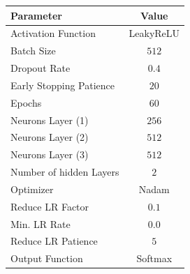 \documentclass[
  12pt,
  bibliography=totoc,     %
  captions=tableheading,  %
  titlepage=firstiscover, %
]{scrartcl}
\begin{document}
\begin{figure}[H]
    \centering
    \begin{minipage}{0.49\textwidth}
        \centering
        \small
        \begin{tabular}{l c}
            \toprule
            Parameter & Value \\
            \midrule
            Activation Function     & LeakyReLU \\
            Batch Size              & $512$     \\
            Dropout Rate            & $0.4$     \\
            Early Stopping Patience & $20$      \\
            Epochs                  & $60$      \\
            Neurons Layer (1)       & $256$     \\
            Neurons Layer (2)       & $512$     \\
            Neurons Layer (3)       & $512$     \\
            Number of hidden Layers & $2$       \\
            Optimizer               & Nadam     \\
            Reduce LR Factor        & $0.1$     \\
            Min. LR Rate            & $0.0$     \\
            Reduce LR Patience      & $5$       \\
            Output Function         & Softmax   \\
            \bottomrule
        \end{tabular}
        \label{tab:my_label_for_table}
    \end{minipage}
    \begin{minipage}{0.49\textwidth}
        \centering

\end{minipage}
\end{figure}
\end{document}
